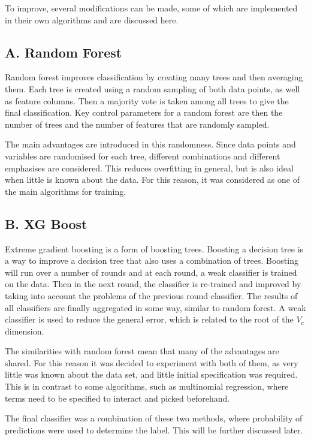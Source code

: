 \documentclass[onecolumn,prl,aps,10pt]{revtex4}
\begin{document}
To improve, several modifications can be made, some of which are implemented in their own algorithms and are discussed here.

\subsection{A. Random Forest}
Random forest improves classification by creating many trees and then averaging them. Each tree is created using a random sampling of both data points, as well as feature columns. Then a majority vote is taken among all trees to give the final classification. Key control parameters for a random forest are then the number of trees and the number of features that are randomly sampled.

The main advantages are introduced in this randomness. Since data points and variables are randomised for each tree, different combinations and different emphasises are considered. This reduces overfitting in general, but is also ideal when little is known about the data. For this reason, it was considered as one of the main algorithms for training.

\subsection{B. XG Boost}
Extreme gradient boosting is a form of boosting trees. Boosting a decision tree is a way to improve a decision tree that also uses a combination of trees. Boosting will run over a number of rounds and at each round, a weak classifier is trained on the data. Then in the next round, the classifier is re-trained and improved by taking into account the problems of the previous round classifier. The results of all classifiers are finally aggregated in some way, similar to random forest. A weak classifier is used to reduce the general error, which is related to the root of the $V_c$ dimension.

The similarities with random forest mean that many of the advantages are shared. For this reason it was decided to experiment with both of them, as very little was known about the data set, and little initial specification was required. This is in contrast to some algorithms, such as multinomial regression, where terms need to be specified to interact and picked beforehand.

The final classifier was a combination of these two methods, where probability of predictions were used to determine the label. This will be further discussed later.
\end{document}
